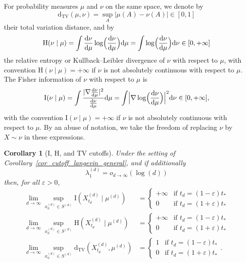 \documentclass[10pt,reqno]{amsart}
\newtheorem{corollary}[theorem]{Corollary}
\numberwithin{equation}{section}
\newcommand{\DTV}{\mathrm{d}_{\mathrm{TV}}}
\begin{document}
For probability measures $\mu$ and $\nu$ on the same space, we denote by
\begin{equation}
    \DTV(\mu,\nu)=\sup_A|\mu(A)-\nu(A)|\in[0,1]
\end{equation}
their total variation distance, and by
\begin{equation}
\mathrm{H}(\nu\mid\mu)
=\int\frac{\mathrm{d}\nu}{\mathrm{d}\mu}\log\Bigl(\frac{\mathrm{d}\nu}{\mathrm{d}\mu}\Bigr)\mathrm{d}\mu
=\int\log\Bigl(\frac{\mathrm{d}\nu}{\mathrm{d}\mu}\Bigr)\mathrm{d}\nu
\in[0,+\infty]
\end{equation}
the relative entropy or Kullback--Leibler divergence of $\nu$ with respect
to $\mu$, with convention $\mathrm{H}(\nu\mid\mu)=+\infty$ if $\nu$ is not
absolutely continuous with respect to $\mu$. The Fisher information of $\nu$ with respect to $\mu$ is 
\begin{equation}
  \mathrm{I}(\nu\mid\mu)
  =\int\frac{|\nabla\frac{\mathrm{d}\nu}{\mathrm{d}\mu}|^2}{\frac{\mathrm{d}\nu}{\mathrm{d}\mu}}\mathrm{d}\mu
  =\int\Bigl|\nabla\log\Bigl(\frac{\mathrm{d}\nu}{\mathrm{d}\mu}\Bigr)\Bigr|^2\mathrm{d}\nu
  \in[0,+\infty],
\end{equation}
with the convention $\mathrm{I}(\nu\mid\mu)=+\infty$ if $\nu$ is not absolutely continuous with respect to $\mu$. 
By an abuse of notation, we take the freedom of replacing $\nu$ by $X\sim\nu$ in these expressions. 

\begin{corollary}[I, H, and TV cutoffs] \label{co:cutoff:tv:H} Under the
  setting of Corollary~\ref{cor_cutoff_langevin_general}, and if additionally
  \begin{equation}
    \lambda_1^{(d)}=o_{d\to\infty}(\log(d))
  \end{equation}
  then, for all $\varepsilon>0$,
 \begin{align}
     \lim_{d\to\infty}
     \sup_{x^{(d)}_0\in S^{(d)}}
     \mathrm{I}(X^{(d)}_{t_d}\mid\mu^{(d)})
     &=
     \begin{cases}
     +\infty & \text{if $t_d=(1-\varepsilon)t_*$}\\
     0 & \text{if $t_d=(1+\varepsilon)t_*$}
     \end{cases}\label{eq:cutoff:I}\\
     \lim_{d\to\infty}
     \sup_{x^{(d)}_0\in S^{(d)}}
     \mathrm{H}(X^{(d)}_{t_d}\mid\mu^{(d)})
     &=
     \begin{cases}
     +\infty & \text{if $t_d=(1-\varepsilon)t_*$}\\
     0 & \text{if $t_d=(1+\varepsilon)t_*$}
     \end{cases}\label{eq:cutoff:H}\\
     \lim_{d\to\infty}
     \sup_{x^{(d)}_0\in S^{(d)}}
     \DTV(X^{(d)}_{t_d},\mu^{(d)})
     &=
     \begin{cases}
     1 & \text{if $t_d=(1-\varepsilon)t_*$}\\
     0 & \text{if $t_d=(1+\varepsilon)t_*$}
     \end{cases}. \label{eq:cutoff:TV}
 \end{align} 
\end{corollary}
\end{document}
